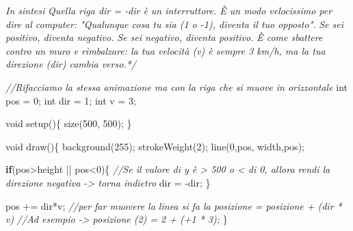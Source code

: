 \documentclass[
]{article}
\newenvironment{Shaded}{}{}
\newcommand{\CommentTok}[1]{\textcolor[rgb]{0.38,0.63,0.69}{\textit{#1}}}
\newcommand{\ControlFlowTok}[1]{\textcolor[rgb]{0.00,0.44,0.13}{\textbf{#1}}}
\newcommand{\DataTypeTok}[1]{\textcolor[rgb]{0.56,0.13,0.00}{#1}}
\newcommand{\DecValTok}[1]{\textcolor[rgb]{0.25,0.63,0.44}{#1}}
\newcommand{\FunctionTok}[1]{\textcolor[rgb]{0.02,0.16,0.49}{#1}}
\newcommand{\NormalTok}[1]{#1}
\newcommand{\OperatorTok}[1]{\textcolor[rgb]{0.40,0.40,0.40}{#1}}
\begin{document}
\begin{Shaded}
\begin{Highlighting}[]
\CommentTok{In sintesi}
\CommentTok{Quella riga dir = {-}dir è un interruttore. È un modo velocissimo per dire al computer: "Qualunque cosa tu sia (1 o {-}1), diventa il tuo opposto".}
\CommentTok{Se sei positivo, diventa negativo.}
\CommentTok{Se sei negativo, diventa positivo.}
\CommentTok{È come sbattere contro un muro e rimbalzare: la tua velocità (v) è sempre 3 km/h, ma la tua direzione (dir) cambia verso.*/}


\CommentTok{//Rifacciamo la stessa animazione ma con la riga che si muove in orizzontale}
\DataTypeTok{int}\NormalTok{ pos }\OperatorTok{=} \DecValTok{0}\OperatorTok{;}
\DataTypeTok{int}\NormalTok{ dir }\OperatorTok{=} \DecValTok{1}\OperatorTok{;}
\DataTypeTok{int}\NormalTok{ v }\OperatorTok{=} \DecValTok{3}\OperatorTok{;}

\DataTypeTok{void} \FunctionTok{setup}\OperatorTok{()\{}
  \FunctionTok{size}\OperatorTok{(}\DecValTok{500}\OperatorTok{,} \DecValTok{500}\OperatorTok{);}
\OperatorTok{\}}

\DataTypeTok{void} \FunctionTok{draw}\OperatorTok{()\{}
  \FunctionTok{background}\OperatorTok{(}\DecValTok{255}\OperatorTok{);}
  \FunctionTok{strokeWeight}\OperatorTok{(}\DecValTok{2}\OperatorTok{);}
  \FunctionTok{line}\OperatorTok{(}\DecValTok{0}\OperatorTok{,}\NormalTok{pos}\OperatorTok{,}\NormalTok{ width}\OperatorTok{,}\NormalTok{pos}\OperatorTok{);}

  \ControlFlowTok{if}\OperatorTok{(}\NormalTok{pos}\OperatorTok{\textgreater{}}\NormalTok{height }\OperatorTok{||}\NormalTok{ pos}\OperatorTok{\textless{}}\DecValTok{0}\OperatorTok{)\{} \CommentTok{//Se il valore di y è \textgreater{} 500 o \textless{} di 0, allora rendi la direzione negativa {-}\textgreater{} torna indietro}
\NormalTok{    dir }\OperatorTok{=} \OperatorTok{{-}}\NormalTok{dir}\OperatorTok{;}
  \OperatorTok{\}}

\NormalTok{  pos }\OperatorTok{+=}\NormalTok{ dir}\OperatorTok{*}\NormalTok{v}\OperatorTok{;} \CommentTok{//per far muovere la linea si fa la posizione = posizione + (dir * v)}
  \CommentTok{//Ad esempio {-}\textgreater{} posizione (2) = 2 + (+1 * 3); }
\OperatorTok{\}}
\end{Highlighting}
\end{Shaded}
\end{document}
